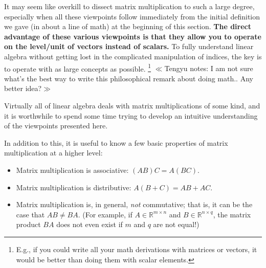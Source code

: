 \documentclass[12pt]{article}
\newcommand{\authnote}[2]{$\ll$\textsf{\footnotesize #1 notes: #2}$\gg$}
\newcommand{\authnote}[2]{}
\newcommand{\Tnote}[1]{{\color{blue}\authnote{Tengyu}{#1}}}
\begin{document}
It may seem like overkill to dissect matrix multiplication to such a
large degree, especially when all these viewpoints follow immediately
from the initial definition we gave (in about a line of math) at the
beginning of this section. {\bf The direct advantage of these various viewpoints is that they allow you to operate on the level/unit of vectors instead of scalars.} To fully understand linear algebra without getting lost in the complicated manipulation of indices, the key is to operate with as large concepts as possible. \footnote{E.g., if you could write all your math derivations with matrices or vectors, it would be better than doing them with scalar elements.}
\Tnote{I am not sure what's the best way to write this philosophical remark about doing math.. Any better idea?}

Virtually all of linear algebra
deals with matrix multiplications of some kind, and it is worthwhile
to spend some time trying to develop an intuitive understanding of the
viewpoints presented here.

In addition to this, it is useful to know a few basic properties of
matrix multiplication at a higher level:
\begin{itemize}
\item Matrix multiplication is associative: $(AB)C = A(BC)$.
\item Matrix multiplication is distributive: $A(B + C) = AB + AC$.
\item Matrix multiplication is, in general, \textit{not} commutative;
  that is, it can be the case that $AB \neq BA$.  (For example,
  if $A \in \mathbb{R}^{m \times n}$ and $B \in \mathbb{R}^{n \times q}$,
  the matrix product $BA$ does not even exist if $m$ and $q$ are not equal!)
\end{itemize}
\end{document}
